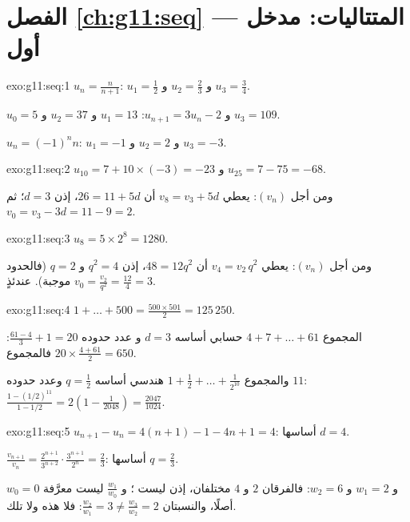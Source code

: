 \section*{الفصل \ref{ch:g11:seq} --- المتتاليات: مدخل أول}

\begin{solution}{exo:g11:seq:1}
$u_n = \frac{n}{n+1}$: $u_1 = \frac12$ و $u_2 = \frac23$ و
$u_3 = \frac34$.

$u_0 = 5$ و $u_{n+1} = 3u_n - 2$: $u_1 = 13$ و $u_2 = 37$ و $u_3 = 109$.

$u_n = (-1)^n n$: $u_1 = -1$ و $u_2 = 2$ و $u_3 = -3$.
\end{solution}

\begin{solution}{exo:g11:seq:2}
$u_{10} = 7 + 10 \times (-3) = -23$ و $u_{25} = 7 - 75 = -68$.

ومن أجل $(v_n)$: يعطي $v_8 = v_3 + 5d$ أن $26 = 11 + 5d$، إذن $d = 3$؛ ثم
$v_0 = v_3 - 3d = 11 - 9 = 2$.
\end{solution}

\begin{solution}{exo:g11:seq:3}
$u_8 = 5 \times 2^8 = 1280$.

ومن أجل $(v_n)$: يعطي $v_4 = v_2\, q^2$ أن $48 = 12 q^2$، إذن $q^2 = 4$ و
$q = 2$ (فالحدود موجبة). عندئذٍ
$v_0 = \frac{v_2}{q^2} = \frac{12}{4} = 3$.
\end{solution}

\begin{solution}{exo:g11:seq:4}
$1 + \dots + 500 = \frac{500 \times 501}{2} = 125\,250$.

المجموع $4 + 7 + \dots + 61$ حسابي أساسه $d = 3$ و
عدد حدوده $\frac{61 - 4}{3} + 1 = 20$: فالمجموع
$20 \times \frac{4 + 61}{2} = 650$.

والمجموع $1 + \frac12 + \dots + \frac{1}{2^{10}}$ هندسي أساسه $q = \frac12$
وعدد حدوده $11$:
$\frac{1 - (1/2)^{11}}{1 - 1/2} = 2\left(1 - \frac{1}{2048}\right)
= \frac{2047}{1024}$.
\end{solution}

\begin{solution}{exo:g11:seq:5}
$u_{n+1} - u_n = 4(n+1) - 1 - 4n + 1 = 4$:  أساسها $d = 4$.

$\frac{v_{n+1}}{v_n} = \frac{2^{n+1}}{3^{n+2}} \cdot \frac{3^{n+1}}{2^n}
= \frac23$:  أساسها $q = \frac23$.

$w_0 = 0$ و $w_1 = 2$ و $w_2 = 6$: فالفرقان $2$ و $4$ مختلفان، إذن
ليست ؛ و $\frac{w_1}{w_0}$ ليست معرَّفة أصلًا، والنسبتان
$\frac{w_2}{w_1} = 3 \neq \frac{w_3}{w_2} = 2$: فلا هذه ولا تلك.
\end{solution}

